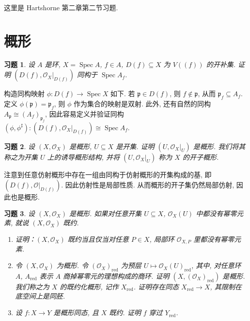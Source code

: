 \documentclass{article}
\theoremstyle{exercise}
\newtheorem{exercise}{习题}[section]
\newenvironment{proofc}{\proof}{\endproof}
\def\gp{\mathfrak{p}}
\def\cO{\mathscr{O}}
\def\red{\mathrm{red}}
\def\Spec{\operatorname{Spec}}
\begin{document}
这里是 Hartshorne 第二章第二节习题.

\setcounter{section}{1}

\section{概形}

\begin{exercise}
  设 $A$ 是环, $X = \Spec A$, $f \in A$, $D(f) \subseteq X$ 为 $V((f))$ 的开补集.
  证明 $(D(f), \cO_X|_{D(f)})$ 同构于 $\Spec A_f$.
\end{exercise}

\begin{proofc}
  构造同构映射 $\phi \colon D(f) \to \Spec X$ 如下.
  若 $\gp \in D(f)$, 则 $f \notin \gp$, 从而 $\gp_f \subseteq A_f$.
  定义 $\phi(\gp) = \gp_f$, 则 $\phi$ 作为集合的映射是双射.
  此外, 还有自然的同构 $A_{\gp} \cong (A_f)_{\gp_f}$,
  因此容易定义并验证同构 $(\phi, \phi^\sharp) \colon (D(f), \cO_X|_{D(f)}) \cong \Spec A_f$.
\end{proofc}

\begin{exercise}
  设 $(X, \cO_X)$ 是概形, $U \subseteq X$ 是开集. 证明 $(U, \cO_X|_U)$ 是概形.
  我们将其称之为开集 $U$ 上的\emph{诱导概形结构},
  并将 $(U, \cO_X|_U)$ 称为 $X$ 的\emph{开子概形}.
\end{exercise}

\begin{proofc}
  注意到任意仿射概形中存在一组由同构于仿射概形的开集构成的基,
  即 $(D(f), \cO|_{D(f)})$. 因此仿射性是局部性质.
  从而概形的开子集仍然局部仿射, 因此也是概形.
\end{proofc}

\begin{exercise}
  设 $(X, \cO_X)$ 是概形. 如果对任意开集 $U \subseteq X$, $\cO_X(U)$ 中都没有幂零元素,
  就说 $(X, \cO_X)$ \emph{既约}.
  \begin{enumerate}[label={(\alph*)}]
    \item 证明：$(X, \cO_X)$ 既约当且仅当对任意 $P \in X$, 局部环 $\cO_{X, P}$ 里都没有幂零元素.
    \item 令 $(X, \cO_X)$ 为概形. 令 $(\cO_X)_{\red}$ 为预层 $U \mapsto \cO_X(U)_{\red}$,
          其中, 对任意环 $A$, $A_{\red}$ 表示 $A$ 商掉幂零元的理想构成的商环.
          证明 $(X, (\cO_X)_{\red})$ 是概形.
          我们称之为 $X$ 的\emph{既约化概形}, 记作 $X_{\red}$.
          证明存在同态 $X_{\red} \to X$, 其限制在底空间上是同胚.
    \item 设 $f \colon X \to Y$ 是概形同态, 且 $X$ 既约. 证明 $f$ 穿过 $Y_{\red}$.
  \end{enumerate}
\end{exercise}
\end{document}
